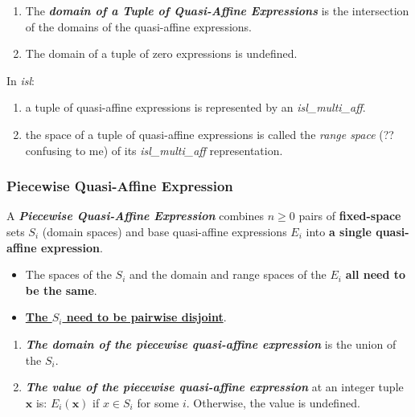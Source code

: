 \begin{info}
\begin{enumerate}
  \item The \textcolor{vr}{\textbf{\emph{domain of a Tuple of Quasi-Affine Expressions}}} is the intersection of the domains of the quasi-affine expressions.
  \item The domain of a tuple of zero expressions is undefined.
\end{enumerate}
\end{info}

In \emph{isl}:

\begin{enumerate}
  \item a tuple of quasi-affine expressions is represented by an \textcolor{pg}{\emph{isl\_multi\_aff}}.
  \item the space of a tuple of quasi-affine expressions is called the \emph{range space} (?? confusing to me) of its \textcolor{pg}{\emph{isl\_multi\_aff}} representation.
\end{enumerate}

\subsubsection{Piecewise Quasi-Affine Expression}

A \textcolor{vr}{\textbf{\emph{Piecewise Quasi-Affine Expression}}} combines $n \ge 0$ pairs of \textbf{fixed-space} sets $S_i$ (domain spaces) and base quasi-affine expressions $E_i$ into \textbf{a single quasi-affine expression}.
\begin{itemize}
  \item The spaces of the $S_i$ and the domain and range spaces of the $E_i$ \textbf{all need to be the same}.
  \item \underline{\textbf{The $S_i$ need to be pairwise disjoint}}.
\end{itemize}

\begin{info}{}
\begin{enumerate}
  \item \textcolor{vr}{\textbf{\emph{The domain of the piecewise quasi-affine expression}}} is the union of the $S_i$.
  \item \textcolor{vr}{\textbf{\emph{The value of the piecewise quasi-affine expression}}} at an integer tuple $\mathbf{x}$ is: $E_i(\mathbf{x})$ if $x \in S_i$ for some $i$. Otherwise, the value is undefined.
\end{enumerate}
\end{info}

